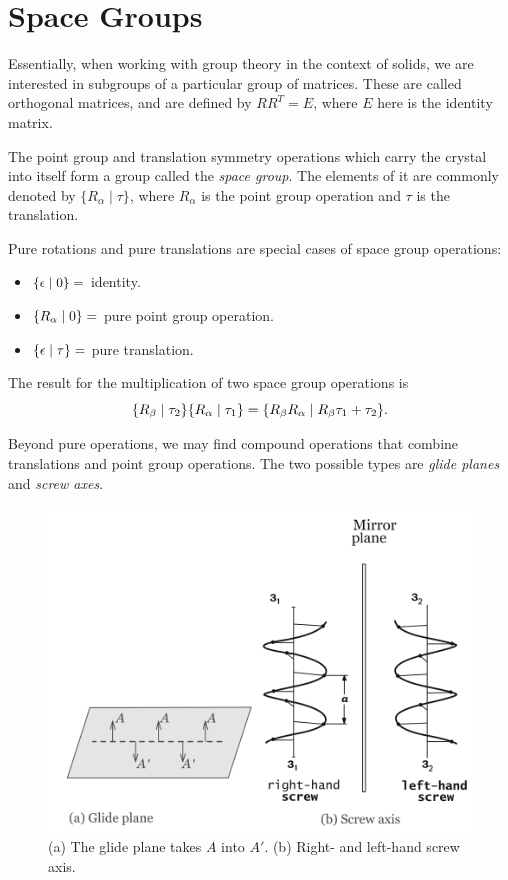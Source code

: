 \section{Space Groups} \label{sec:space_groups}


Essentially, when working with group theory in the context of solids, we are interested in subgroups of a particular group of matrices. These are called orthogonal matrices, and are defined by $R R^T = E$, where $E$ here is the identity matrix.

\n

The point group and translation symmetry operations which carry the crystal into itself form a group called the \textit{space group}. The elements of it are commonly denoted by  $\{ R_\alpha \mid \tau \} $, where $R_\alpha$ is the point group operation and $\tau$ is the translation.

Pure rotations and pure translations are special cases of space group operations:
\begin{itemize}
\item $\{ \epsilon \mid 0 \} =$ identity.
\item $\{ R_\alpha \mid 0 \} =$ pure point group operation.
\item $\{ \epsilon \mid \tau \} =$ pure translation.
\end{itemize}

The result for the multiplication of two space group operations is
$$
\{ R_\beta \mid \tau_2 \} \{ R_\alpha \mid \tau_1 \} = \{ R_\beta R_\alpha \mid R_\beta\tau_1 + \tau_2 \}.
$$

Beyond pure operations, we may find compound operations that combine translations and point group operations. The two possible types are \textit{glide planes} and \textit{screw axes}.
\begin{figure}[H]
\centering
\includegraphics[width=0.5\linewidth]{fig/glideplane-screwaxis.png}
\caption{(a) The glide plane takes $A$ into $A'$. (b) Right- and left-hand screw axis.}
\label{fig:glideplane-screwaxis}
\end{figure}


